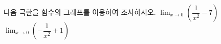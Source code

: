 다음 극한을 함수의 그래프를 이용하여 조사하시오.
 $\displaystyle\lim_{x\to 0}\left(\dfrac{1}{x^2}-7\right)$
 $\displaystyle\lim_{x\to 0}\left(-\dfrac{1}{x^2}+1\right)$
